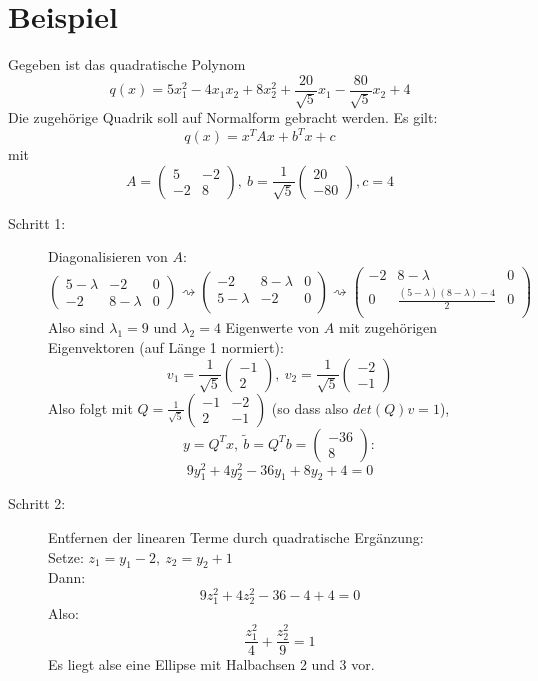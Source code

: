 \documentclass{scrbook}
\begin{document}
\section{Beispiel}
Gegeben ist das quadratische Polynom
\[q(x)=5x_1^2-4x_1x_2+8x_2^2+ \frac{20}{\sqrt{5}}x_1 - \frac{80}{\sqrt{5}}x_2+4\]
Die zugehörige Quadrik soll auf Normalform gebracht werden. Es gilt:
\[q(x) = x^TAx+b^Tx+c\] mit \[
A=\left(
\begin{array}{cc}
5&-2\\
-2&8
\end{array}
\right), \ b= \frac{1}{\sqrt{5}}\left(
\begin{array}{c}
20 \\-80
\end{array}
\right), c=4
\]
\begin{description}
\item[Schritt 1:] Diagonalisieren von $A$:
\[
\left(
\begin{array}{cc|c}
5-\lambda & -2&0\\
-2&8-\lambda&0
\end{array}
\right)\rightsquigarrow
\left(
\begin{array}{cc|c}
-2&8-\lambda&0\\
5-\lambda & -2&0\\
\end{array}
\right)\rightsquigarrow
\left(
\begin{array}{cc|c}
-2&8-\lambda&0\\
0 & \frac{(5-\lambda)(8-\lambda)-4}{2}&0\\
\end{array}
\right)
\]
Also sind $\lambda_1=9$ und $\lambda_2 = 4$ Eigenwerte von $A$ mit zugehörigen Eigenvektoren (auf Länge 1 normiert):
\[v_1= \frac{1}{\sqrt{5}} \left(
\begin{array}{c}
-1\\2
\end{array}
\right)
,\ 
v_2= \frac{1}{\sqrt{5}} \left(
\begin{array}{c}
-2\\-1
\end{array}
\right)\]
Also folgt mit $Q = \frac{1}{\sqrt{5}}
\left(
\begin{array}{cc}
-1&-2\\
2&-1
\end{array}
\right)$ (so dass also $det(Q)v=1$),\[y=Q^Tx, \ \tilde{b} = Q^Tb =\left(
\begin{array}{c}
-36\\8
\end{array}
\right):\]
\[
9y_1^2+4y_2^2-36y_1+8y_2+4=0
\]
\item[Schritt 2:] Entfernen der linearen Terme durch quadratische Ergänzung:\\
Setze: $z_1=y_1-2, \ z_2=y_2+1$\\
Dann:
\[9z_1^2+4z_2^2-36-4+4=0\]
Also:
\[
\frac{z_1^2}{4} + \frac{z_2^2}{9} = 1
\]
Es liegt alse eine Ellipse mit Halbachsen 2 und 3 vor.
\end{description}
\end{document}
